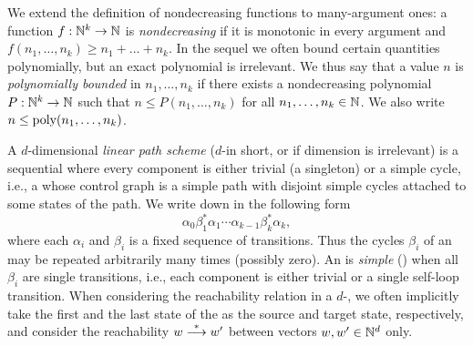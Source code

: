 

\begin{appendixproof}
We extend the definition of nondecreasing functions to many-argument ones:
a function $f: \mathbb{N}^k \to \mathbb{N}$ is \emph{nondecreasing} if it is monotonic
in every argument and $f(n_1, \ldots, n_k) \geq n_1 + \ldots + n_k$.
In the sequel we often bound certain quantities polynomially, but an exact polynomial is irrelevant. 
We thus say that a value $n$ is \emph{polynomially bounded} in $n_1, \ldots, n_k$
if there exists a nondecreasing polynomial $P: \mathbb{N}^k \to \mathbb{N}$ such that $n \leq P(n_1, \ldots, n_k)$
for all $n_1, \ldots, n_k \in \mathbb{N}$. 
We also write $n \leq \textup{poly}(n_1, \ldots, n_k)$.

A $d$-dimensional \emph{linear path scheme} ($d$-\LPS in short, or \LPS if dimension is irrelevant) 
is a sequential \vass where every component is either trivial (a singleton) or a simple cycle,
i.e., a \vass whose control graph is a simple path with disjoint simple cycles attached to some states of the path.
We write down \LPS in the following form 
\[
\alpha_0\beta_1^* \alpha_1 \cdots \alpha_{k-1} \beta_{k}^* \alpha_k,
\]
where each $\alpha_i$ and $\beta_i$ is  a fixed sequence of transitions. 
Thus the cycles $\beta_i$ of an \lps may be repeated arbitrarily many times (possibly zero). 
An \LPS is \emph{simple} (\SLPS) when all $\beta_i$ are single transitions, i.e.,
each component is either trivial or a single self-loop transition.
When considering the reachability relation in a $d$-\LPS, we often implicitly take the first and the last state
of the \LPS as the source and target state, respectively, and consider the reachability $w\stackrel{*}{\longrightarrow} w'$ between
vectors $w,w'\in\mathbb{N}^d$ only.



\end{appendixproof}
